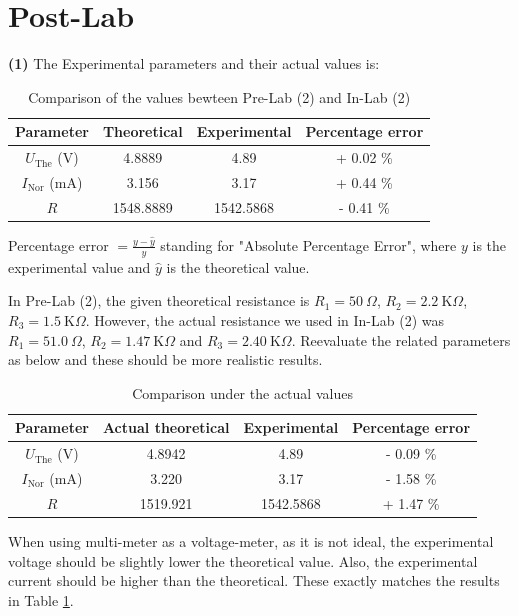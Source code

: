 \documentclass[UTF8]{report}
\def\kO{\ \mathrm{K}\Omega}
\def\KO{\ \mathrm{K}\Omega}
\theoremstyle{MyLineTheoremStyle} %
\theoremstyle{MyBlockTheoremStyle} %
\theoremstyle{MySubsubsectionStyle} %
\begin{document}
\section{Post-Lab}

\noindent\textbf{(1)}
The Experimental parameters and their actual values is:
\begin{table}[H]\centering
    \caption{Comparison of the values bewteen Pre-Lab (2) and In-Lab (2)}
\begin{tabular}{cccc}\hline
    Parameter & Theoretical & Experimental & Percentage error \\
    \hline
    $U_{\text{The}}$ (V) & 4.8889     &  4.89   & + 0.02 \%  \\
    $I_{\text{Nor}}$ (mA)& 3.156      &  3.17    & + 0.44 \%  \\
    $R$                  & 1548.8889  & 1542.5868  & - 0.41 \%  \\
    \hline
\end{tabular}
\end{table}
Percentage error $= \frac{y - \hat{y}}{y}$ standing for "Absolute Percentage Error", where $y$ is the experimental value and $\hat{y}$ is the theoretical value.

In Pre-Lab (2), the given theoretical resistance is $R_1 = 50 \ \Omega$, $R_2 = 2.2 \KO$, $R_3 = 1.5 \KO$. However, the actual resistance we used in In-Lab (2) was $R_1 = 51.0 \ \Omega$, $R_2 = 1.47 \kO$ and $R_3 = 2.40 \KO$. Reevaluate the related parameters as below and these should be more realistic results.

\begin{table}[H]\centering
    \caption{Comparison under the actual values}
    \label{Comparison under the actual values}
\begin{tabular}{cccc}\hline
    Parameter & Actual theoretical & Experimental & Percentage error \\
    \hline
    $U_{\text{The}}$ (V) & 4.8942     &  4.89      & - 0.09 \% \\
    $I_{\text{Nor}}$ (mA)& 3.220      &  3.17      & - 1.58 \% \\
    $R$                  & 1519.921   & 1542.5868  & + 1.47 \% \\
    \hline
\end{tabular}
\end{table}
When using multi-meter as a voltage-meter, as it is not ideal, the  experimental voltage should be slightly lower the theoretical value. Also, the experimental current should be higher than the theoretical. These exactly matches the results in Table \ref{Comparison under the actual values}.
\end{document}
